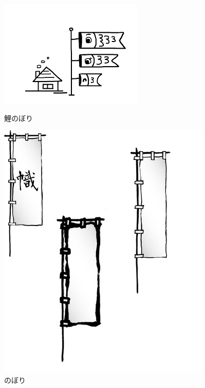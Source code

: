 	\begin{figure}[h]
		\centering
		\begin{minipage}{.45\textwidth}
			\centering
			\includegraphics[width=\textwidth]{00x_citanje_tango_res/koinobori}
			\caption{鯉のぼり}
		\end{minipage}
		\begin{minipage}{.45\textwidth}
			\centering
			\includegraphics[width=.6\textwidth]{00x_citanje_tango_res/nobori}
			\caption{のぼり}
		\end{minipage}
	\end{figure}
	
	\newpage
	
